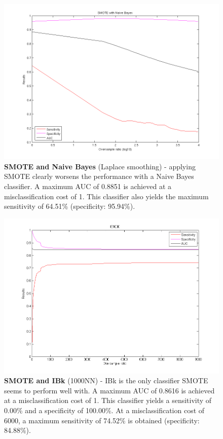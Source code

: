 \newpage
\label{exp-smote-nb}
\begin{figure}[h]
\includegraphics[scale=0.65]{img/smote.png}
\caption{\textbf{SMOTE and Naive Bayes} (Laplace smoothing) - applying SMOTE clearly worsens the performance with a Naive Bayes classifier.  A maximum AUC of 0.8851 is achieved at a  misclassification cost of 1. This classifier also yields the maximum sensitivity of 64.51\% (specificity: 95.94\%).}
\end{figure}

\newpage
\begin{figure}[h]
\includegraphics[scale=0.65]{img/SMOTE_IB1000.png}
\caption{\textbf{SMOTE and IBk} (1000NN) - IBk is the only classifier SMOTE seems to perform well with. A maximum AUC of 0.8616 is achieved at a  misclassification cost of 1. This classifier yields a sensitivity of 0.00\% and a specificity of 100.00\%. At a misclassification cost of 6000, a maximum sensitivity of 74.52\% is obtained (specificity: 84.88\%).}
\end{figure}

